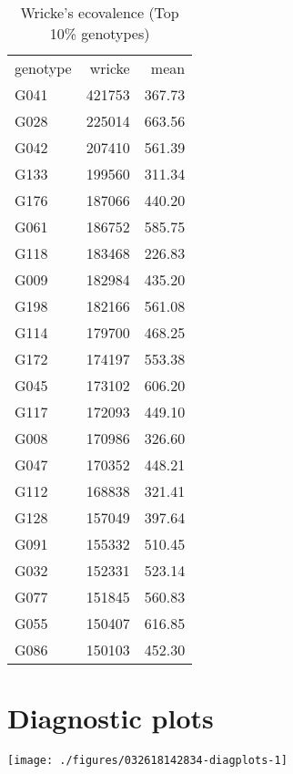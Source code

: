 \documentclass[a4paper,11pt]{article}\usepackage[]{graphicx}\usepackage[]{color}
\makeatletter
\def\maxwidth{ %
  \ifdim\Gin@nat@width>\linewidth
    \linewidth
  \else
    \Gin@nat@width
  \fi
}
\newenvironment{knitrout}{}{} %
\makeatother
\begin{document}
\begin{table}[ht]
\begin{flushleft}
\caption{Wricke's ecovalence (Top 10\% genotypes)} 
\label{wricke}
\begin{tabular}{lrr}
 genotype & wricke & mean \\ 
 G041 & 421753 & 367.73 \\ 
  G028 & 225014 & 663.56 \\ 
  G042 & 207410 & 561.39 \\ 
  G133 & 199560 & 311.34 \\ 
  G176 & 187066 & 440.20 \\ 
  G061 & 186752 & 585.75 \\ 
  G118 & 183468 & 226.83 \\ 
  G009 & 182984 & 435.20 \\ 
  G198 & 182166 & 561.08 \\ 
  G114 & 179700 & 468.25 \\ 
  G172 & 174197 & 553.38 \\ 
  G045 & 173102 & 606.20 \\ 
  G117 & 172093 & 449.10 \\ 
  G008 & 170986 & 326.60 \\ 
  G047 & 170352 & 448.21 \\ 
  G112 & 168838 & 321.41 \\ 
  G128 & 157049 & 397.64 \\ 
  G091 & 155332 & 510.45 \\ 
  G032 & 152331 & 523.14 \\ 
  G077 & 151845 & 560.83 \\ 
  G055 & 150407 & 616.85 \\ 
  G086 & 150103 & 452.30 \\ 
  \end{tabular}
\end{flushleft}
\end{table}


\clearpage
\section{Diagnostic plots}
\begin{knitrout}
\color{fgcolor}

\texttt{[image: ./figures/032618142834-diagplots-1]} \hfill{}



\end{knitrout}

\end{document}
